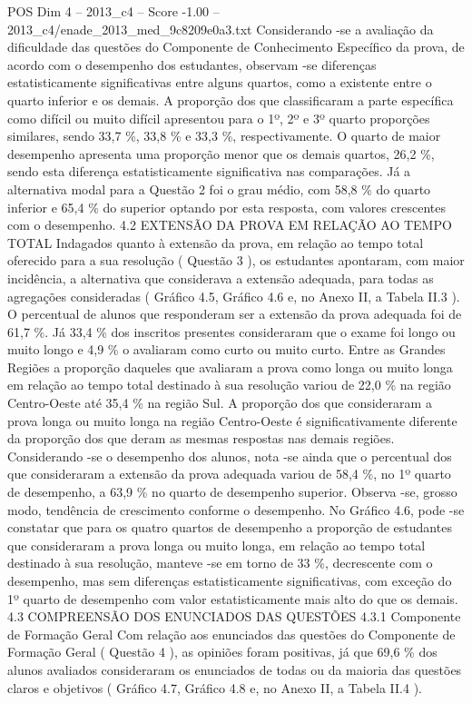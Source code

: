 \begin{textsample}{POS Dim 4 – 2013\_c4 – Score -1.00 – 2013\_c4/enade\_2013\_med\_9c8209e0a3.txt}
Considerando -se a avaliação da dificuldade das questões do Componente de Conhecimento Específico da prova, de acordo com o desempenho dos estudantes, observam -se diferenças estatisticamente significativas entre alguns quartos, como a existente entre o quarto inferior e os demais.
A proporção dos que classificaram a parte específica como difícil ou muito difícil apresentou para o 1º, 2º e 3º quarto proporções similares, sendo 33,7 \%, 33,8 \% e 33,3 \%, respectivamente.
O quarto de maior desempenho apresenta uma proporção menor que os demais quartos, 26,2 \%, sendo esta diferença estatisticamente significativa nas comparações.
Já a alternativa modal para a Questão 2 foi o grau médio, com 58,8 \% do quarto inferior e 65,4 \% do superior optando por esta resposta, com valores crescentes com o desempenho. 4.2 EXTENSÃO DA PROVA EM RELAÇÃO AO TEMPO TOTAL Indagados quanto à extensão da prova, em relação ao tempo total oferecido para a sua resolução ( Questão 3 ), os estudantes apontaram, com maior incidência, a alternativa que considerava a extensão adequada, para todas as agregações consideradas ( Gráfico 4.5, Gráfico 4.6 e, no Anexo II, a Tabela II.3 ).
O percentual de alunos que responderam ser a extensão da prova adequada foi de 61,7 \%.
Já 33,4 \% dos inscritos presentes consideraram que o exame foi longo ou muito longo e 4,9 \% o avaliaram como curto ou muito curto.
Entre as Grandes Regiões a proporção daqueles que avaliaram a prova como longa ou muito longa em relação ao tempo total destinado à sua resolução variou de 22,0 \% na região Centro-Oeste até 35,4 \% na região Sul.
A proporção dos que consideraram a prova longa ou muito longa na região Centro-Oeste é significativamente diferente da proporção dos que deram as mesmas respostas nas demais regiões.
Considerando -se o desempenho dos alunos, nota -se ainda que o percentual dos que consideraram a extensão da prova adequada variou de 58,4 \%, no 1º quarto de desempenho, a 63,9 \% no quarto de desempenho superior.
Observa -se, grosso modo, tendência de crescimento conforme o desempenho.
No Gráfico 4.6, pode -se constatar que para os quatro quartos de desempenho a proporção de estudantes que consideraram a prova longa ou muito longa, em relação ao tempo total destinado à sua resolução, manteve -se em torno de 33 \%, decrescente com o desempenho, mas sem diferenças estatisticamente significativas, com exceção do 1º quarto de desempenho com valor estatisticamente mais alto do que os demais. 4.3 COMPREENSÃO DOS ENUNCIADOS DAS QUESTÕES 4.3.1 Componente de Formação Geral Com relação aos enunciados das questões do Componente de Formação Geral ( Questão 4 ), as opiniões foram positivas, já que 69,6 \% dos alunos avaliados consideraram os enunciados de todas ou da maioria das questões claros e objetivos ( Gráfico 4.7, Gráfico 4.8 e, no Anexo II, a Tabela II.4 ).

\end{textsample}
